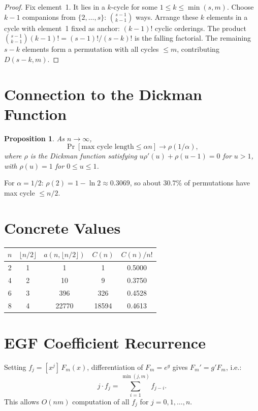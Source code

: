 \documentclass[11pt]{article}
\newtheorem{proposition}[theorem]{Proposition}
\begin{document}
\begin{proof}
Fix element~1. It lies in a $k$-cycle for some $1 \le k \le \min(s,m)$. Choose $k-1$ companions from $\{2,\ldots,s\}$: $\binom{s-1}{k-1}$ ways. Arrange these $k$ elements in a cycle with element~1 fixed as anchor: $(k-1)!$ cyclic orderings. The product $\binom{s-1}{k-1}(k-1)! = (s-1)!/(s-k)!$ is the falling factorial. The remaining $s-k$ elements form a permutation with all cycles $\le m$, contributing $D(s-k, m)$.
\end{proof}

\section{Connection to the Dickman Function}

\begin{proposition}
As $n \to \infty$,
\[
\Pr[\text{max cycle length} \le \alpha n] \longrightarrow \rho(1/\alpha),
\]
where $\rho$ is the Dickman function satisfying $u\rho'(u) + \rho(u-1) = 0$ for $u > 1$, with $\rho(u) = 1$ for $0 \le u \le 1$.
\end{proposition}

For $\alpha = 1/2$: $\rho(2) = 1 - \ln 2 \approx 0.3069$, so about $30.7\%$ of permutations have max cycle $\le n/2$.

\section{Concrete Values}

\begin{center}
\begin{tabular}{ccccc}
\toprule
$n$ & $\lfloor n/2 \rfloor$ & $a(n, \lfloor n/2 \rfloor)$ & $C(n)$ & $C(n)/n!$ \\
\midrule
2  & 1 & 1     & 1     & 0.5000 \\
4  & 2 & 10    & 9     & 0.3750 \\
6  & 3 & 396   & 326   & 0.4528 \\
8  & 4 & 22770 & 18594 & 0.4613 \\
\bottomrule
\end{tabular}
\end{center}

\section{EGF Coefficient Recurrence}

Setting $f_j = [x^j]\,F_m(x)$, differentiation of $F_m = e^g$ gives $F_m' = g' F_m$, i.e.:
\[
j \cdot f_j = \sum_{i=1}^{\min(j,m)} f_{j-i}.
\]
This allows $O(nm)$ computation of all $f_j$ for $j = 0, 1, \ldots, n$.
\end{document}
